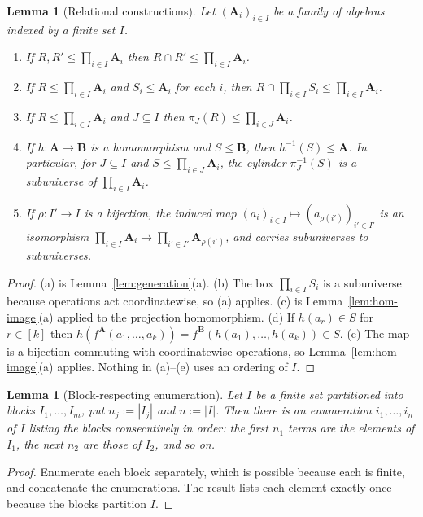 \documentclass[11pt]{article}
\theoremstyle{mainplain}
\newtheorem{lemma}[theorem]{Lemma}
\theoremstyle{mainroman}
\theoremstyle{definition}
\newcommand{\alphlabels}{\renewcommand{\labelenumi}{\textup{(\alph{enumi})}}%
  \renewcommand{\theenumi}{\alph{enumi}}}
\providecommand{\tightlist}{\setlength{\itemsep}{0pt}\setlength{\parskip}{0pt}}
\numberwithin{equation}{section}
\newcommand{\bA}{\mathbf A}
\newcommand{\bB}{\mathbf B}
\begin{document}
\begin{lemma}[Relational constructions]\label{lem:pp}
Let $(\bA_i)_{i\in I}$ be a family of algebras indexed by a finite set $I$.
\begin{enumerate}\alphlabels\tightlist
\item If $R,R'\le\prod_{i\in I}\bA_i$ then $R\cap R'\le\prod_{i\in I}\bA_i$.
\item If $R\le\prod_{i\in I}\bA_i$ and $S_i\le\bA_i$ for each $i$, then
      $R\cap\prod_{i\in I}S_i\le\prod_{i\in I}\bA_i$.
\item If $R\le\prod_{i\in I}\bA_i$ and $J\subseteq I$ then
      $\pi_J(R)\le\prod_{i\in J}\bA_i$.
\item If $h:\bA\to\bB$ is a homomorphism and $S\le\bB$, then
      $h^{-1}(S)\le\bA$. In particular, for $J\subseteq I$ and
      $S\le\prod_{i\in J}\bA_i$, the cylinder $\pi_J^{-1}(S)$ is a subuniverse
      of $\prod_{i\in I}\bA_i$.
\item If $\rho:I'\to I$ is a bijection, the induced map
      $(a_i)_{i\in I}\mapsto(a_{\rho(i')})_{i'\in I'}$ is an isomorphism
      $\prod_{i\in I}\bA_i\to\prod_{i'\in I'}\bA_{\rho(i')}$, and carries
      subuniverses to subuniverses.
\end{enumerate}
\end{lemma}
\begin{proof}
(a) is Lemma~\ref{lem:generation}(a). (b) The box $\prod_{i\in I}S_i$ is a
subuniverse because operations act coordinatewise, so (a) applies. (c) is
Lemma~\ref{lem:hom-image}(a) applied to the projection homomorphism. (d) If
$h(a_r)\in S$ for $r\in[k]$ then
$h(f^{\bA}(a_1,\dots,a_k))=f^{\bB}(h(a_1),\dots,h(a_k))\in S$. (e) The map is a
bijection commuting with coordinatewise operations, so
Lemma~\ref{lem:hom-image}(a) applies. Nothing in (a)--(e) uses an ordering of
$I$.
\end{proof}

\begin{lemma}[Block-respecting enumeration]\label{lem:block-enumeration}
Let $I$ be a finite set partitioned into blocks $I_1,\dots,I_m$, put
$n_j:=|I_j|$ and $n:=|I|$. Then there is an enumeration $i_1,\dots,i_n$ of $I$
listing the blocks consecutively in order: the first $n_1$ terms are the
elements of $I_1$, the next $n_2$ are those of $I_2$, and so on.
\end{lemma}
\begin{proof}
Enumerate each block separately, which is possible because each is finite, and
concatenate the enumerations. The result lists each element exactly once
because the blocks partition $I$.
\end{proof}
\end{document}

